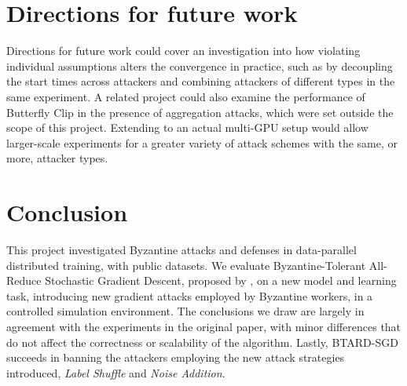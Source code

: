 \documentclass{article}
\begin{document}
\section{Directions for future work}

Directions for future work could cover an investigation into how violating individual assumptions alters the convergence in practice, such as by decoupling the start times across attackers and combining attackers of different types in the same experiment. A related project could also examine the performance of Butterfly Clip in the presence of aggregation attacks, which were set outside the scope of this project. Extending to an actual multi-GPU setup would allow larger-scale experiments for a greater variety of attack schemes with the same, or more, attacker types.

\section{Conclusion}
This project investigated Byzantine attacks and defenses in data-parallel distributed training, with public datasets. We evaluate Byzantine-Tolerant All-Reduce Stochastic Gradient Descent, proposed by \cite{gorbunov2021secure}, on a new model and learning task, introducing new gradient attacks employed by Byzantine workers, in a controlled simulation environment. The conclusions we draw are largely in agreement with the experiments in the original paper, with minor differences that do not affect the correctness or scalability of the algorithm. Lastly, BTARD-SGD succeeds in banning the attackers employing the new attack strategies introduced, \textit{Label Shuffle} and \textit{Noise Addition}.



\end{document}
